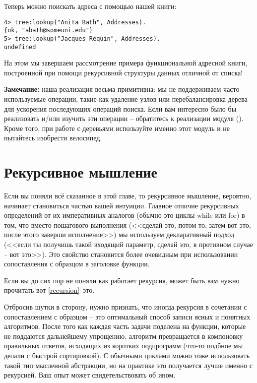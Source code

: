 Теперь можно поискать адреса с помощью нашей книги:
\begin{lstlisting}[style=erlang]
4> tree:lookup("Anita Bath", Addresses).
{ok, "abath@someuni.edu"}
5> tree:lookup("Jacques Requin", Addresses).
undefined
\end{lstlisting}

На этом мы завершаем рассмотрение примера функциональной адресной книги, построенной при помощи рекурсивной структуры данных отличной от списка!\\
\colorbox{lgray}
{
    \begin{minipage}{\linewidth}
\textbf{Замечание:} наша реализация весьма примитивна: мы не поддерживаем часто используемые операции, такие как удаление узлов или перебалансировка дерева для ускорения последующих операций поиска. Если вам интересно было бы реализовать и/или изучить эти операции \--- обратитесь к реализации модуля  (). Кроме того, при работе с деревьями используйте именно этот модуль и не пытайтесь изобрести велосипед.
    \end{minipage}
}
\section{Рекурсивное мышление}
Если вы поняли всё сказанное в этой главе, то рекурсивное мышление, вероятно, начинает становиться частью вашей интуиции. Главное отличие рекурсивных определений от их императивных аналогов (обычно это циклы while или for) в том, что вместо пошагового выполнения (<<сделай это, потом то, затем вот это, после этого заверши исполнение>>) мы используем декларативный подход (<<если ты получишь такой входящий параметр, сделай это, в противном случае \--- вот это>>). Это свойство становится более очевидным при использовании сопоставления с образцом в заголовке функции.

Если вы до сих пор не поняли как работает рекурсия, может быть вам нужно прочитать вот \ref{recursion}~это.

Отбросив шутки в сторону, нужно признать, что иногда рекурсия в сочетании с сопоставлением с образцом \--- это оптимальный способ записи ясных и понятных алгоритмов. После того как каждая часть задачи поделена на функции, которые не поддаются дальнейшему упрощению, алгоритм превращается в компоновку правильных ответов, исходящих из коротких подпрограмм (что\--то подбное мы делали с быстрой сортировкой). С обычными циклами можно тоже использовать такой тип мысленной абстракции, но на практике это получается лучше именно с рекурсией. Ваш опыт может свидетельствовать об ином.

